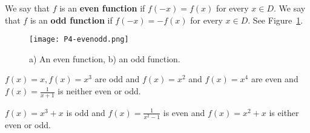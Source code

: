 \documentclass[../main.tex]{subfiles}
\begin{document}
\begin{definition}
We say that $f$ is an \textbf{even function} if $f\left( -x\right) =f\left( x\right) $ for every $x\in D$.
We say that $f$ is an \textbf{odd function} if $f(-x)=-f(x)$ for every $x\in D$. See Figure~\ref{fig:evenoddfunc}.
\end{definition}

\begin{figure}[H]
  \centering
  \texttt{[image: P4-evenodd.png]}
  \caption{a) An even function, b) an odd function.}
  \label{fig:evenoddfunc}
\end{figure}
\begin{example}
$f(x)=x,f(x)=x^{3}$ are odd and $f(x)=x^{2}$ and $f(x) =x^{4}$ are even and $f(x)=\frac{1}{x+1}$ is neither even or odd.
\end{example}

\begin{example}
$f(x)=x^{3}+x$ is odd and $f(x)=\frac{1}{x^{2}-1}$ is even and $f(x)=x^{2}+x$
is either even or odd.
\end{example}
\end{document}
